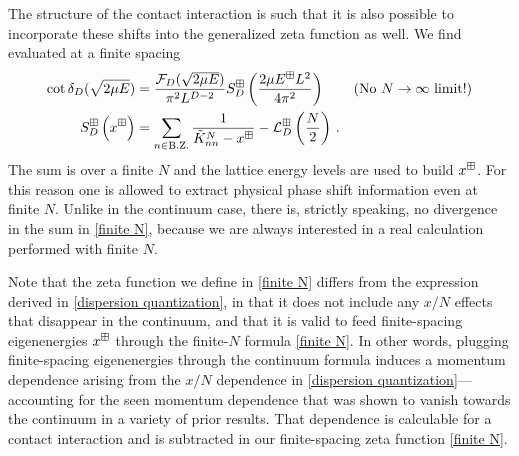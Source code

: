 The structure of the contact interaction is such that it is also possible to incorporate these shifts into the generalized zeta function as well.
We find evaluated at a finite spacing 
\begin{align}
    \cot \delta_D(\sqrt{2\mu E})
    &=
    \frac{\mathcal{F}_D(\sqrt{2\mu E})}{\pi^2 L^{D-2}} S^{\boxplus }_D\left(\frac{2\mu E^{\boxplus} L^2}{4\pi^2}\right)
    && \text{(No $N\rightarrow\infty$ limit!)}
    \\
    \label{eq:finite N}
    S^{\boxplus}_D\left(x^\boxplus\right)
    &=
		\sum_{n\in\text{B.Z.}}\frac{1}{ \tilde K_{nn}^{N} - x^\boxplus} - \mathcal{L}_D^{\boxplus}\left(\frac{N}{2}\right)
	\, .
\end{align}
The sum is over a finite $N$ and the lattice energy levels are used to build $x^\boxplus$.
For this reason one is allowed to extract physical phase shift information even at finite $N$.
Unlike in the continuum case, there is, strictly speaking, no divergence in the sum in \eqref{finite N}, because we are always interested in a real calculation performed with finite $N$.

Note that the zeta function we define in \eqref{finite N} differs from the expression derived in \eqref{dispersion quantization}, in that it does not include any $x/N$ effects that disappear in the continuum, and that it is valid to feed finite-spacing eigenenergies $x^\boxplus$ through the finite-$N$ formula \eqref{finite N}.
In other words, plugging finite-spacing eigenenergies through the continuum formula induces a momentum dependence arising from the $x/N$ dependence in \eqref{dispersion quantization}---accounting for the seen momentum dependence that was shown to vanish towards the continuum in a variety of prior results.  That dependence is calculable for a contact interaction and is subtracted in our finite-spacing zeta function \eqref{finite N}.

